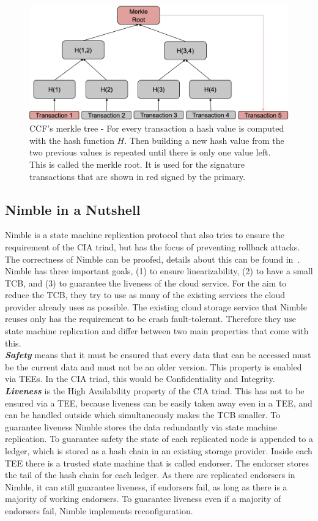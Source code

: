\begin{figure}[t]
	\includegraphics[scale=0.17]{pictures/merkle_new}
	\caption{CCF's merkle tree - For every transaction a hash value is computed with the hash function $H$. Then building a new hash value from the two previous values is repeated until there is only one value left. This is called the merkle root. It is used for the signature transactions that are shown in red signed by the primary.}
	\label{merkle}
\end{figure}



\subsection{Nimble in a Nutshell}
Nimble is a state machine replication protocol that also tries to ensure the requirement of the CIA triad, but has the focus of preventing rollback attacks. The correctness of Nimble can be proofed, details about this can be found in~\cite{Nimble}.\\
Nimble has three important goals, (1) to ensure linearizability, (2) to have a small TCB, and (3) to guarantee the liveness of the cloud service. For the aim to reduce the TCB, they try to use as many of the existing services the cloud provider already uses as possible. The existing cloud storage service that Nimble reuses only has the requirement to be crash fault-tolerant. Therefore they use state machine replication and differ between two main properties that come with this.\\
	\textbf{\textit{Safety}} means that it must be ensured that every data that can be accessed must be the current data and must not be an older version. This property is enabled via TEEs. In the CIA triad, this would be Confidentiality and Integrity.\\
	\textbf{\textit{Liveness}} is the High Availability property of the CIA triad. This has not to be ensured via a TEE, because liveness can be easily taken away even in a TEE, and can be handled outside which simultaneously makes the TCB smaller.
	To guarantee liveness Nimble stores the data redundantly via state machine replication. To guarantee safety the state of each replicated node is appended to a ledger, which is stored as a hash chain in an existing storage provider. Inside each TEE there is a trusted state machine that is called endorser. The endorser stores the tail of the hash chain for each ledger. As there are replicated endorsers in Nimble, it can still guarantee liveness, if endorsers fail, as long as there is a majority of working endorsers. To guarantee liveness even if a majority of endorsers fail, Nimble implements reconfiguration. 
